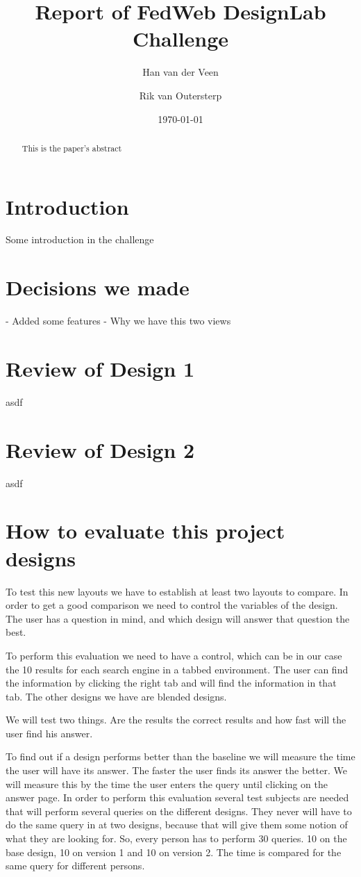 \documentclass[12pt]{article}
\title{Report of FedWeb DesignLab Challenge}
\author{
        Han van der Veen \\
            \and
			Rik van Outersterp
}
\date{\today}
\begin{document}
\maketitle

\begin{abstract}
This is the paper's abstract
\end{abstract}

\section{Introduction}
Some introduction in the challenge

\section{Decisions we made}
- Added some features
- Why we have this two views

\section{Review of Design 1}
asdf

\section{Review of Design 2}
asdf

\section{How to evaluate this project designs}
To test this new layouts we have to establish at least two layouts to compare. In order to get a good comparison we need to control the variables of the design. The user has a question in mind, and which design will answer that question the best. 

To perform this evaluation we need to have a control, which can be in our case the 10 results for each search engine in a tabbed environment. The user can find the information by clicking the right tab and will find the information in that tab. The other designs we have are blended designs.

We will test two things. Are the results the correct results and how fast will the user find his answer. 

To find out if a design performs better than the baseline we will measure the time the user will have its answer. The faster the user finds its answer the better. We will measure this by the time the user enters the query until clicking on the answer page. In order to perform this evaluation several test subjects are needed that will perform several queries on the different designs. They never will have to do the same query in at two designs, because that will give them some notion of what they are looking for. So, every person has to perform 30 queries. 10 on the base design, 10 on version 1 and 10 on version 2. The time is compared for the same query for different persons.
\end{document}
